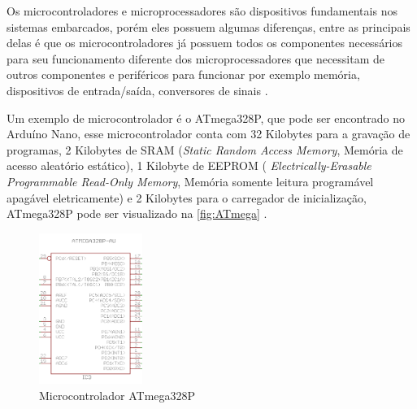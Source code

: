     \par
    Os microcontroladores e microprocessadores são dispositivos fundamentais nos sistemas embarcados, porém eles possuem algumas diferenças,
    entre as principais delas é que os microcontroladores já possuem todos os componentes necessários para seu funcionamento diferente dos microprocessadores que necessitam de outros componentes e periféricos para funcionar por exemplo memória, dispositivos de entrada/saída, conversores de sinais \cite{ayala:1991}.  
    
    \par
    Um exemplo de microcontrolador é o ATmega328P, que pode ser encontrado no Arduíno Nano, esse microcontrolador conta com 32 Kilobytes para a gravação de programas, 2 Kilobytes de SRAM (\textit{Static Random Access Memory}, Memória de acesso aleatório estático), 1 Kilobyte de EEPROM ( \textit{Electrically-Erasable Programmable Read-Only Memory}, Memória somente leitura programável apagável eletricamente) e 2 Kilobytes para o carregador de inicialização, ATmega328P pode ser visualizado na \autoref{fig:ATmega} \cite{arduino}.

   \begin{figure}[h!]
              \caption{\label{fig:ATmega}{Microcontrolador ATmega328P}}
              \centering
              \includegraphics[width=0.3\textwidth]{Figuras/atmega.PNG}
    \end{figure}
 
